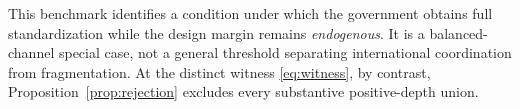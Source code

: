 This benchmark identifies a condition under which
the government obtains full standardization while
the design margin remains \emph{endogenous}.
It is a balanced-channel special case, not a
general threshold separating international
coordination from fragmentation. At the distinct
witness \eqref{eq:witness}, by contrast,
Proposition~\ref{prop:rejection} excludes every
substantive positive-depth union.
